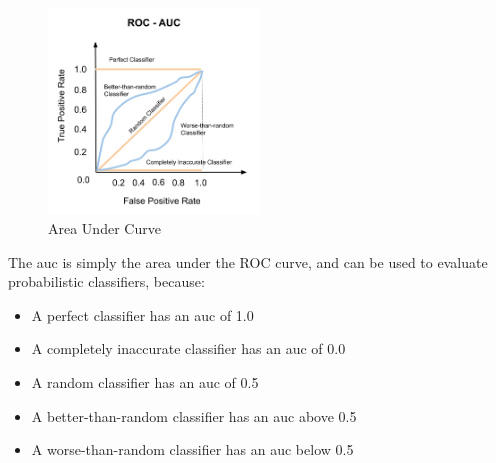 \begin{figure}
    \centering
    \includegraphics[width=0.5\textwidth]{Figures/02/02_AUC.png}
    \caption{Area Under Curve}
    \label{fig:02_auc}
\end{figure}

The \gls{auc} is simply the area under the ROC curve, and can be used to evaluate probabilistic classifiers, because:

\begin{itemize}
    \item A perfect classifier has an \gls{auc} of 1.0
    \item A completely inaccurate classifier has an \gls{auc} of 0.0
    \item A random classifier has an \gls{auc} of 0.5
    \item A better-than-random classifier has an \gls{auc} above 0.5
    \item A worse-than-random classifier has an \gls{auc} below 0.5
\end{itemize}

